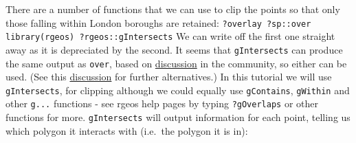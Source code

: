 \documentclass[]{article}
\begin{document}
There are a number of functions that we can use to clip the points so
that only those falling within London boroughs are retained:
\texttt{?overlay ?sp::over library(rgeos) ?rgeos::gIntersects} We can
write off the first one straight away as it is depreciated by the
second. It seems that \texttt{gIntersects} can produce the same output
as \texttt{over}, based on
\href{http://gis.stackexchange.com/questions/63793/how-to-overlay-a-polygon-over-spatialpointsdataframe-and-preserving-the-spdf-dat}{discussion}
in the community, so either can be used. (See this
\href{http://stackoverflow.com/questions/15881455/how-to-clip-worldmap-with-polygon-in-r}{discussion}
for further alternatives.) In this tutorial we will use
\texttt{gIntersects}, for clipping although we could equally use
\texttt{gContains}, \texttt{gWithin} and other \texttt{g...} functions -
see rgeos help pages by typing \texttt{?gOverlaps} or other functions
for more. \texttt{gIntersects} will output information for each point,
telling us which polygon it interacts with (i.e.~the polygon it is in):
\end{document}
